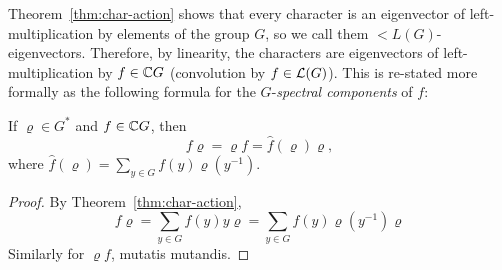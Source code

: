 Theorem~\ref{thm:char-action} shows that every character is
an eigenvector of left-multiplication by elements of the
group $G$, so we call them $\lt{L}(G)$-eigenvectors.
Therefore, by linearity, the characters are eigenvectors
of left-multiplication by $f\in \mathbb{C} G$ (convolution by
$f\in \mathcal{L}(G)$).  This is re-stated more formally as the following
formula for the $G$-\emph{spectral components} of $f$:
\begin{corollary}\label{cor:FT}
If $\varrho\in G^*$ and $f\in \mathbb{C} G$, then
\begin{equation}\label{eq:FT}
f\varrho = \varrho f = \hat{f}(\varrho)\varrho,
\end{equation}
where $\hat{f}(\varrho) = \sum_{y\in G} f(y) \varrho(y^{-1})$.
\end{corollary}
\begin{proof}
By Theorem~\ref{thm:char-action},
\begin{equation}
f\varrho = \sum_{y\in G} f(y) y\varrho =  \sum_{y\in G} f(y)\varrho(y^{-1}) \varrho
\end{equation}
Similarly for $\varrho f$, mutatis mutandis.
\end{proof}

